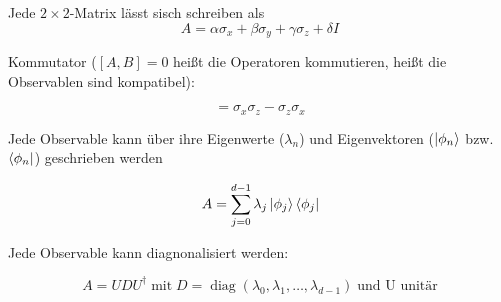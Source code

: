 \documentclass[a4paper,german,10pt,smallheadings]{scrartcl}
\begin{document}
Jede $2\times2$-Matrix lässt sisch schreiben als
\begin{equation*}
  A = \alpha \sigma_x + \beta \sigma_y + \gamma \sigma_z + \delta I
\end{equation*}

Kommutator ($[A,B] = 0$ heißt die Operatoren kommutieren, heißt die Observablen sind kompatibel):

\begin{equation*}
  [\sigma_x, \sigma_z] = \sigma_x\sigma_z - \sigma_z\sigma_x
\end{equation*}

Jede Observable kann über ihre Eigenwerte ($\lambda_n$) und Eigenvektoren
($\ket{\phi_n}$ bzw. $\bra{\phi_n}$) geschrieben werden

\begin{equation*}
  A = \sum_{j=0}^{d-1} \lambda_j \ket{\phi_j} \bra{\phi_j}
\end{equation*}

Jede Observable kann diagnonalisiert werden:

\begin{equation*}
  A = UDU^\dagger \; \text{mit} \; D = \operatorname{diag}(\lambda_0, \lambda_1, \dots, \lambda_{d-1}) \; \text{und U unitär}
\end{equation*}
\end{document}
